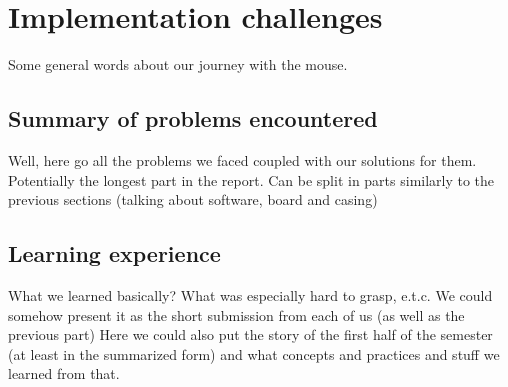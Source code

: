 \section{Implementation challenges}
Some general words about our journey with the mouse.

\subsection{Summary of problems encountered}
Well, here go all the problems we faced coupled with our solutions for them. Potentially the longest part in the report. Can be split in parts similarly to the previous sections (talking about software, board and casing)

\subsection{Learning experience} %

What we learned basically? What was especially hard to grasp, e.t.c.
We could somehow present it as the short submission from each of us (as well as the previous part) Here we could also put the story of the first half of the semester (at least in the summarized form) and what concepts and practices and stuff we learned from that.


